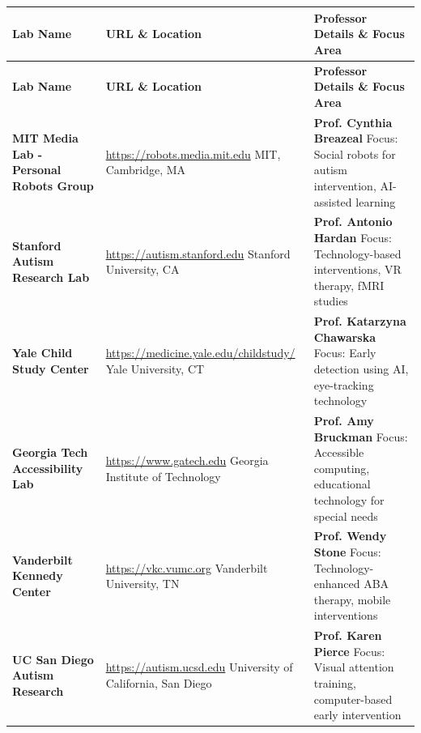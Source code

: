 \documentclass[12pt, a4paper]{article}
\begin{document}
\begin{longtable}{|>{\raggedright}p{4.5cm}|>{\raggedright}p{5cm}|>{\raggedright\arraybackslash}p{4.5cm}|}
\hline
\rowcolor{nebulapink!30}
\textbf{Lab Name} & \textbf{URL \& Location} & \textbf{Professor Details \& Focus Area} \\
\hline
\endfirsthead

\hline
\rowcolor{nebulapink!30}
\textbf{Lab Name} & \textbf{URL \& Location} & \textbf{Professor Details \& Focus Area} \\
\hline
\endhead

\hline
\endfoot

\textbf{MIT Media Lab - Personal Robots Group} & \url{https://robots.media.mit.edu} \newline MIT, Cambridge, MA & \textbf{Prof. Cynthia Breazeal} \newline Focus: Social robots for autism intervention, AI-assisted learning \\
\hline

\textbf{Stanford Autism Research Lab} & \url{https://autism.stanford.edu} \newline Stanford University, CA & \textbf{Prof. Antonio Hardan} \newline Focus: Technology-based interventions, VR therapy, fMRI studies \\
\hline

\textbf{Yale Child Study Center} & \url{https://medicine.yale.edu/childstudy/} \newline Yale University, CT & \textbf{Prof. Katarzyna Chawarska} \newline Focus: Early detection using AI, eye-tracking technology \\
\hline

\textbf{Georgia Tech Accessibility Lab} & \url{https://www.gatech.edu} \newline Georgia Institute of Technology & \textbf{Prof. Amy Bruckman} \newline Focus: Accessible computing, educational technology for special needs \\
\hline

\textbf{Vanderbilt Kennedy Center} & \url{https://vkc.vumc.org} \newline Vanderbilt University, TN & \textbf{Prof. Wendy Stone} \newline Focus: Technology-enhanced ABA therapy, mobile interventions \\
\hline

\textbf{UC San Diego Autism Research} & \url{https://autism.ucsd.edu} \newline University of California, San Diego & \textbf{Prof. Karen Pierce} \newline Focus: Visual attention training, computer-based early intervention \\
\hline


\end{longtable}
\end{document}
